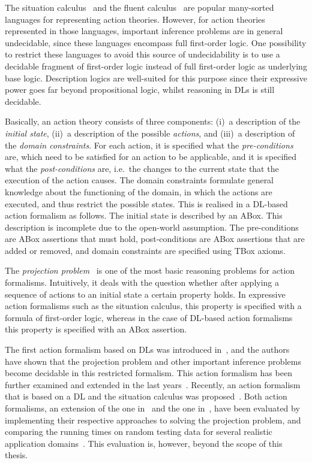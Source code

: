The situation calculus~\cite{Rei-01} and the fluent calculus~\cite{Thi-05} are
popular many-sorted languages for representing action theories.  However, for
action theories represented in those languages, important inference problems are
in general undecidable, since these languages encompass full first-order logic.
%
One possibility to restrict these languages to avoid this source of
undecidability is to use a decidable fragment of first-order logic instead of
full first-order logic as underlying base logic.  Description logics are
well-suited for this purpose since their expressive power goes far beyond
propositional logic, whilst reasoning in DLs is still decidable.

Basically, an action theory consists of three components: (i)~a description of
the \emph{initial state}, (ii)~a description of the possible \emph{actions}, and
(iii)~a description of the \emph{domain constraints}.  For each action, it is
specified what the \emph{pre-conditions} are, which need to be satisfied for an
action to be applicable, and it is specified what the \emph{post-conditions}
are, i.e.~the changes to the current state that the execution of the action
causes.  The domain constraints formulate general knowledge about the
functioning of the domain, in which the actions are executed, and thus restrict
the possible states.  This is realised in a DL-based action formalism as
follows.  The initial state is described by an ABox.  This description is
incomplete due to the open-world assumption.  The pre-conditions are ABox
assertions that must hold, post-conditions are ABox assertions that are added or
removed, and domain constraints are specified using TBox axioms.

The \emph{projection problem}~\cite{Rei-01} is one of the most basic reasoning
problems for action formalisms.  Intuitively, it deals with the question whether
after applying a sequence of actions to an initial state a certain property
holds.  In expressive action formalisms such as the situation calculus, this
property is specified with a formula of first-order logic, whereas in the case
of DL-based action formalisms this property is specified with an ABox assertion.

The first action formalism based on DLs was introduced in~\cite{BLM+-AAAI05},
and the authors have shown that the projection problem and other important
inference problems become decidable in this restricted formalism.  This action
formalism has been further examined and extended in the last
years~\cite{LLM+-JELIA06,BaLM-ECAI10,BaLL-LPAR10,BaZa-FroCoS13}.
%
Recently, an action formalism that is based on a DL and the situation calculus
was proposed~\cite{GuSo-AMAI10,SoYe-DL12}.  Both action formalisms, an extension
of the one in~\cite{BLM+-AAAI05} and the one in~\cite{GuSo-AMAI10,SoYe-DL12},
have been evaluated by implementing their respective approaches to solving the
projection problem, and comparing the running times on random testing data for
several realistic application domains~\cite{YLL+-DL12}.  This evaluation is,
however, beyond the scope of this thesis.

